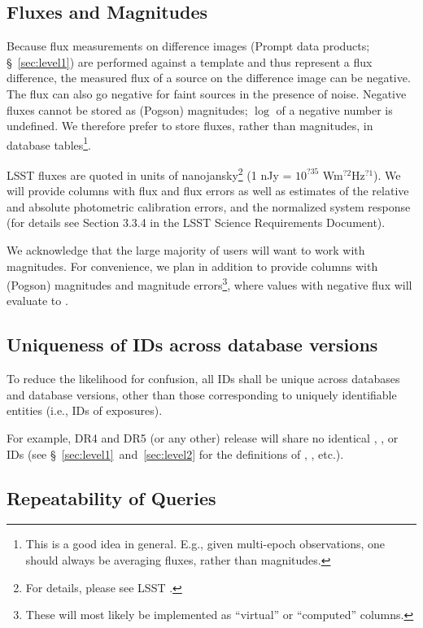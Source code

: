 \documentclass[SE,lsstdraft,toc]{lsstdoc}
\begin{document}
\subsection{Fluxes and Magnitudes}
\label{sec:fluxes}
Because flux measurements on difference images (Prompt data products; \S~\ref{sec:level1}) are performed against a template
and thus represent a flux difference, the measured flux of a source on the difference image can be negative. The flux can also go negative for faint sources in the presence of noise. Negative fluxes cannot be stored as (Pogson) magnitudes; $\log$ of a negative number is undefined. We therefore prefer to store fluxes, rather than magnitudes, in database tables\footnote{This is a good idea in general. E.g., given multi-epoch observations, one should always be averaging fluxes, rather than magnitudes.}.

LSST fluxes are quoted in units of nanojansky\footnote{For details, please see LSST .} (1 nJy = $10^{?35}$ Wm$^{?2}$Hz$^{?1}$).
We will provide columns with flux and flux errors as well as estimates of the relative and absolute photometric calibration errors, and the normalized system response (for details see Section 3.3.4 in the LSST Science Requirements Document).

We acknowledge that the large majority of users will want to work with magnitudes. For convenience, we plan
in addition
to provide columns with (Pogson) magnitudes and magnitude errors\footnote{These will most likely be implemented as ``virtual'' or ``computed'' columns.}, where values with negative flux will evaluate to .

\subsection{Uniqueness of IDs across database versions}

To reduce the likelihood for confusion, all IDs shall be unique across databases and database versions, other than those corresponding to uniquely identifiable entities (i.e., IDs of exposures).

For example, DR4 and DR5 (or any other) release will share no identical \Object, \Source, \DIAObject or \DIASource IDs (see \S~\ref{sec:level1}~and~\ref{sec:level2} for the definitions of \Objects, \DIAObjects, etc.).

\subsection{Repeatability of Queries}
\end{document}
